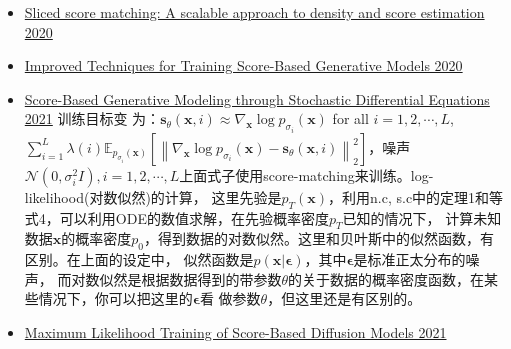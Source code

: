 \begin{itemize}
  \item \href{c.c}{Sliced score matching: A scalable approach to density and score estimation 2020}
  \item \href{c}{Improved Techniques for Training Score-Based Generative Models 2020}
  \item \href{c}{Score-Based Generative Modeling through Stochastic Differential Equations 2021} 训练目标变
  为：$\mathbf{s}_\theta(\mathbf{x}, i) \approx \nabla_{\mathbf{x}} \log p_{\sigma_i}(\mathbf{x})$
  for all $i=1,2, \cdots, L$, $\sum_{i=1}^L \lambda(i) \mathbb{E}_{p_{\sigma_i}(\mathbf{x})}
  \left[\left\|\nabla_{\mathbf{x}} \log p_{\sigma_i}(\mathbf{x})-\mathbf{s}_\theta(\mathbf{x}, i)
  \right\|_2^2\right]$，噪声$\mathcal{N}\left(0, \sigma_i^2 I\right), i=1,2, \cdots, L
  $上面式子使用score-matching来训练。log-likelihood(对数似然)的计算，
  这里先验是$p_T(\mathbf{x})$，利用n.c, s.c中的定理1和等式4，可以利用ODE的数值求解，在先验概率密度$p_T$已知的情况下，
  计算未知数据$\mathbf{x}$的概率密度$p_0$，得到数据的对数似然。这里和贝叶斯中的似然函数，有区别。在上面的设定中，
  似然函数是$p(\mathbf{x}|\mathbf{\epsilon})$，其中$\mathbf{\epsilon}$是标准正太分布的噪声，
  而对数似然是根据数据得到的带参数$\theta$的关于数据的概率密度函数，在某些情况下，你可以把这里的$\mathbf{\epsilon}$看
  做参数$\theta$，但这里还是有区别的。
  \item \href{c.c}{Maximum Likelihood Training of Score-Based Diffusion Models 2021}


\end{itemize}
